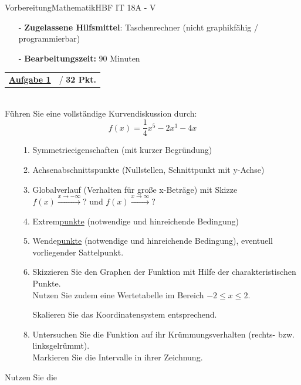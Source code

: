 \documentclass[oneside,openany,headings=optiontotoc,11pt,numbers=noenddot]{scrreprt}
\begin{document}
\begin{test}{Vorbereitung}{Mathematik}{HBF IT 18A - V}
\begin{framed}
{\begin{itemize}[noitemsep,topsep=0pt]
				\item[-] \textbf{Zugelassene Hilfsmittel}: Taschenrechner (nicht graphikfähig / programmierbar)
				\item[-] \textbf{Bearbeitungszeit:} 90 Minuten
			\end{itemize}}
		\end{framed}
		\normalsize
		\noindent
		\begin{framed}
			\begin{tabularx}{\textwidth}{Xl}\underline{\textbf{Aufgabe 1}}& / \textbf{32 Pkt.} \end{tabularx}\\
			Führen Sie eine vollständige Kurvendiskussion durch:\[f(x) = \frac{1}{4}x^5 - 2x^3 -4x\]
			\begin{enumerate}
				\item[]
				\begin{enumerate}
					\item Symmetrieeigenschaften (mit kurzer Begründung)
					\item Achsenabschnittspunkte (Nullstellen, Schnittpunkt mit y-Achse)
					\item Globalverlauf (Verhalten für große x-Beträge) mit Skizze\\
					\footnotesize{\(f(x)\xrightarrow{x\rightarrow-\infty}\)? und \(f(x)\xrightarrow{x\rightarrow\infty}\)?}\normalsize
					\item Extrem\underline{punkte} (notwendige und hinreichende Bedingung)
					\item Wende\underline{punkte} (notwendige und hinreichende Bedingung), eventuell vorliegender Sattelpunkt.
					\item Skizzieren Sie den Graphen der Funktion mit Hilfe der charakteristischen Punkte.\\
					Nutzen Sie zudem eine Wertetabelle im Bereich \(-2\leq{}x\leq{}2\).
					\item[] \footnotesize{}Skalieren Sie das Koordinatensystem entsprechend.\normalsize
					\item Untersuchen Sie die Funktion auf ihr Krümmungsverhalten (rechts- bzw. linksgelrümmt).\\
					Markieren Sie die Intervalle in ihrer Zeichnung.
				\end{enumerate}
			\end{enumerate}
			Nutzen Sie die 
		\end{framed}
	\end{test}
	
	\addtolength{\topmargin}{-.875in}
\end{document}
